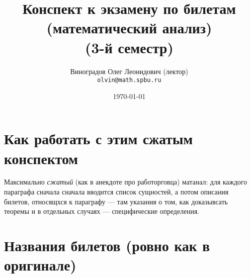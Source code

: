 \documentclass[12pt, a4paper, oneside]{memoir}
\title{Конспект к экзамену по билетам (математический анализ) \\(3-й семестр)}
\author{
  \vova
  \and
  Виноградов Олег Леонидович (лектор)\\
  \texttt{olvin@math.spbu.ru}
}
\date{\today}
\begin{document}
\maketitle
\newpage
\tableofcontents
\newpage


\section{Как работать с этим сжатым конспектом}


Максимально \textit{сжатый} (как в анекдоте про работорговца) матанал: 
для каждого параграфа сначала сначала вводится список сущностей, 
а потом описания билетов, относящхся к параграфу — 
там указания о том, как доказывсать теоремы и в отдельных случаях — специфические определения.

\section{Названия билетов (ровно как в оригинале)}
\end{document}

